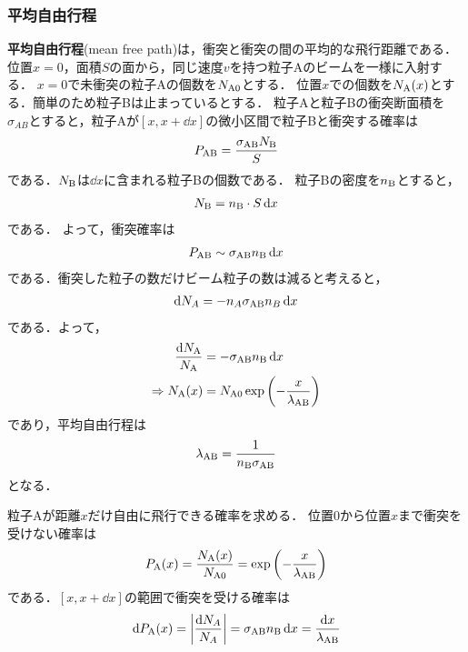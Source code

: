 \documentclass{report}
\begin{document}
      \subsubsection{平均自由行程}
        \textbf{平均自由行程}(mean free path)は，衝突と衝突の間の平均的な飛行距離である．
        位置$x = 0$，面積$S$の面から，同じ速度$v$を持つ粒子Aのビームを一様に入射する．
        $x = 0$で未衝突の粒子Aの個数を$N_{\mathrm{A}0}$とする．
        位置$x$での個数を$N_{\mathrm{A}}(x)$とする．簡単のため粒子Bは止まっているとする．
        粒子Aと粒子Bの衝突断面積を$\sigma_{AB}$とすると，粒子Aが$[x, x + \dd{x}]$の微小区間で粒子Bと衝突する確率は
        \begin{align}
          P_{\mathrm{AB}} = \frac{\sigma_{\mathrm{AB}}N_{\mathrm{B}}}{S}
        \end{align}
        である．$N_{\mathrm{B}}$は$\dd{x}$に含まれる粒子Bの個数である．
        粒子Bの密度を$n_{\mathrm{B}}$とすると，
        \begin{align}
          N_{\mathrm{B}} = n_{\mathrm{B}}\cdot S \dd{x}
        \end{align}
        である．
        よって，衝突確率は
        \begin{align}
          P_{\mathrm{AB}} \sim \sigma_{\mathrm{AB}} n_{\mathrm{B}} \dd{x}
        \end{align}
        である．衝突した粒子の数だけビーム粒子の数は減ると考えると，
        \begin{align}
          \dd{N_A} = -n_A \sigma_{\mathrm{AB}} n_B \dd{x}
        \end{align}
        である．よって，
        \begin{align}
          \frac{\dd{N_{\mathrm{A}}}}{N_{\mathrm{A}}} &= - \sigma_{\mathrm{AB}} n_{\mathrm{B}} \dd{x}\\
          \Rightarrow N_{\mathrm{A}}(x) &= N_{\mathrm{A0}} \exp\qty(-\frac{x}{\lambda_{\mathrm{AB}}})
        \end{align}
        であり，平均自由行程は
        \begin{align}
          \lambda_{\mathrm{AB}} = \frac{1}{n_{\mathrm{B}} \sigma_{\mathrm{AB}}}
        \end{align}
        となる．
        \par
        粒子Aが距離$x$だけ自由に飛行できる確率を求める．
        位置$0$から位置$x$まで衝突を受けない確率は
        \begin{align}
          P_{\mathrm{A}}(x) = \frac{N_{\mathrm{A}}(x)}{N_{\mathrm{A0}}} = \exp\qty(-\frac{x}{\lambda_{\mathrm{AB}}})
        \end{align}
        である．$[x, x+\dd{x}]$の範囲で衝突を受ける確率は
        \begin{align}
          \dd{P_{\mathrm{A}}(x)} = \abs{\frac{\dd{N_A}}{N_A}} = \sigma_{\mathrm{AB}} n_{\mathrm{B}} \dd{x} = \frac{\dd{x}}{\lambda_{\mathrm{AB}}}
        \end{align}
\end{document}
